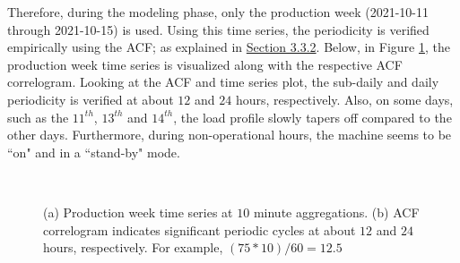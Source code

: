 Therefore, during the modeling phase, only the production week (2021-10-11 through 2021-10-15) is used. Using this time series, the periodicity is verified empirically using the ACF; as explained in \hyperlink{subsubsection.3.3.2}{Section 3.3.2}. Below, in Figure \ref{fig:fig10}, the production week time series is visualized along with the respective ACF correlogram. Looking at the ACF and time series plot, the sub-daily and daily periodicity is verified at about $12$ and $24$ hours, respectively. Also, on some days, such as the $11^{th}$, $13^{th}$ and $14^{th}$, the load profile slowly tapers off compared to the other days. Furthermore, during non-operational hours, the machine seems to be ``on" and in a ``stand-by" mode.  

\begin{figure}[H]
    \centering
    \graphicspath{ {./images/} }
     \\
    \caption{(a) Production week time series at $10$ minute aggregations. (b) ACF correlogram indicates significant periodic cycles at about $12$ and $24$ hours, respectively. For example, $(75*10) / 60 = 12.5$} 
    \label{fig:fig10}
\end{figure}

